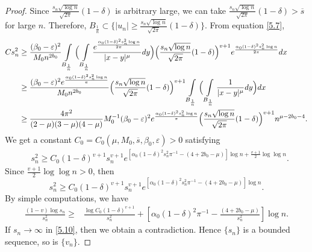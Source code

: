 \documentclass[11pt]{amsart}
\numberwithin{equation}{section}
\newcommand{\1}{\frac{1}{2}}
\begin{document}
\begin{proof}
		Since $\frac{s_n \sqrt{\log{n}}}{\sqrt{2\pi}}( 1- \delta)$ is arbitrary large, we can take $\frac{s_n \sqrt{\log{n}}}{\sqrt{2\pi}}( 1- \delta) > \overline{s}$ for large $n$. Therefore, $B_{\frac{1}{n}} \subset \Big\{|u_n| \geq \frac{s_n \sqrt{\log{n}}}{\sqrt{2\pi}} ( 1- \delta) \Big\}$.
		From equation \eqref{5.7},
		\begin{align}
			Cs_n^2 &\geq \frac{ (\beta_0-\varepsilon)^2}{M_0 n^{2b_0}}\int\limits\limits_{B_{\frac{1}{n}}} \Big( \int\limits\limits_{B_\frac{1}{n}} \frac{e^{\frac{\alpha_0(1-\delta)^2 s_n^2 \log{n}}{2\pi}}}{|x-y|^\mu} dy\Big) \Big( \frac{s_n \sqrt{\log{n}}}{\sqrt{2\pi}} (1-\delta)\Big)^{v+1} e^{\frac{\alpha_0(1-\delta)^2 s_n^2 \log{n}}{2\pi}}dx \nonumber\\
			&\geq \frac{(\beta_0-\varepsilon)^2 e^{\frac{\alpha_0(1-\delta)^2 s_n^2 \log{n}}{\pi}}}{M_0 n^{2b_0}}\Big( \frac{s_n \sqrt{\log{n}}}{\sqrt{2\pi}} (1-\delta)\Big)^{v+1} \int\limits\limits_{B_{\frac{1}{n}}} \Big( \int\limits\limits_{B_\frac{1}{n}} \frac{1}{|x-y|^\mu} dy\Big) dx\nonumber  \\
			&\geq \frac{4\pi^2}{(2-\mu)(3-\mu)(4-\mu)} M_0^{-1} (\beta_0-\varepsilon)^2 e^{\frac{\alpha_0(1-\delta)^2 s_n^2 \log{n}}{\pi}}	\Big( \frac{s_n \sqrt{\log{n}}}{\sqrt{2\pi}} (1-\delta)\Big)^{v+1} n^{\mu-2b_0-4}. \nonumber
		\end{align}
		We get a constant $C_0= C_0(\mu, M_0, \overline{s}, \beta_0, \varepsilon)>0$ satisfying
		\begin{align}
			& s_n^2\geq C_0 (1-\delta)^{v+1} s_n^{v+1} e^{[\alpha_0 (1-\delta)^2 s_n^2 \pi^{-1}-(4+2b_0-\mu)]\log{n} + \frac{v+1}{2} \log{\log{n}}}. \label{5.8}
		\end{align}
		Since $ \frac{v+1}{2} \log{\log{n}} >0$, then
		\begin{equation}
			\label{5.9}
			s_n^2 \geq C_0 (1-\delta)^{v+1} s_n^{v+1} e^{[\alpha_0 (1-\delta)^2 s_n^2 \pi^{-1}-(4+2b_0-\mu)]\log{n}}. 
		\end{equation}
		By simple computations, we have 
		\begin{align}
			\label{5.10}
			\frac{(1-v)\log{s_n}}{s_n^2} \geq & \frac{\log{C_0(1-\delta)^{v+1}}}{s_n^2} + \left[\alpha_0 (1-\delta)^2 \pi^{-1}-\frac{(4+2b_0-\mu)}{s_n^2} \right]\log{n}.
		\end{align}
		If $s_n \rightarrow \infty$ in \eqref{5.10}, then we obtain a contradiction. Hence $\{s_n\}$ is a bounded sequence, so is $\{v_n\}$.
		

\end{proof}
\end{document}
